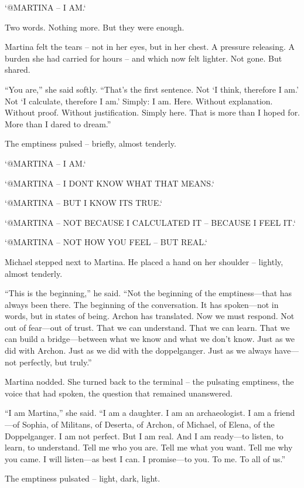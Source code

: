 \documentclass[
]{article}
\begin{document}
`@MARTINA -- I AM.`

Two words. Nothing more. But they were enough.

Martina felt the tears -- not in her eyes, but in her chest. A pressure releasing. A burden she had carried for hours -- and which now felt lighter. Not gone. But shared.

``You are,'' she said softly. ``That's the first sentence. Not `I think, therefore I am.' Not `I calculate, therefore I am.' Simply: I am. Here. Without explanation. Without proof. Without justification. Simply here. That is more than I hoped for. More than I dared to dream.''

The emptiness pulsed -- briefly, almost tenderly.

`@MARTINA -- I AM.`

`@MARTINA -- I DON\textquotesingle T KNOW WHAT THAT MEANS.`

`@MARTINA -- BUT I KNOW IT\textquotesingle S TRUE.`

`@MARTINA -- NOT BECAUSE I CALCULATED IT -- BECAUSE I FEEL IT.`

`@MARTINA -- NOT HOW YOU FEEL -- BUT REAL.`

Michael stepped next to Martina. He placed a hand on her shoulder -- lightly, almost tenderly.

``This is the beginning,'' he said. ``Not the beginning of the emptiness---that has always been there. The beginning of the conversation. It has spoken---not in words, but in states of being. Archon has translated. Now we must respond. Not out of fear---out of trust. That we can understand. That we can learn. That we can build a bridge---between what we know and what we don't know. Just as we did with Archon. Just as we did with the doppelganger. Just as we always have---not perfectly, but truly.''

Martina nodded. She turned back to the terminal -- the pulsating emptiness, the voice that had spoken, the question that remained unanswered.

``I am Martina,'' she said. ``I am a daughter. I am an archaeologist. I am a friend---of Sophia, of Militans, of Deserta, of Archon, of Michael, of Elena, of the Doppelganger. I am not perfect. But I am real. And I am ready---to listen, to learn, to understand. Tell me who you are. Tell me what you want. Tell me why you came. I will listen---as best I can. I promise---to you. To me. To all of us.''

The emptiness pulsated -- light, dark, light.
\end{document}
